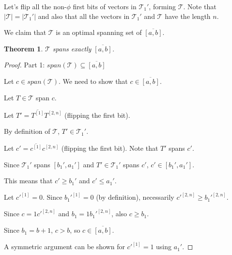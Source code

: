 \documentclass{article}
\theoremstyle{plain}
\newtheorem{theorem}{Theorem}[subsection]
\theoremstyle{definition}
\newcommand{\interval}[2]{[#1, #2]}
\newcommand{\compl}[1]{\overline{#1}}
\newcommand{\finterval}[2]{\compl{\interval{#1}{#2}}}
\newcommand{\bit}[2]{#1^{[#2]}}
\newcommand{\bits}[3]{#1^{\interval{#2}{#3}}}
\begin{document}
Let's flip all the non-$\phi$ first bits
of vectors in $\mathcal{T}_1'$,
forming $\mathcal{T}$.
Note that $|\mathcal{T}| = |\mathcal{T}_1'|$
and also that all the vectors in $\mathcal{T}_1'$
and $\mathcal{T}$ have the length $n$.

We claim that $\mathcal{T}$ is an optimal spanning set
of $\finterval{a}{b}$.

\begin{theorem} \label{diffsound}
$\mathcal{T}$ spans exactly $\finterval{a}{b}$.
\end{theorem}

\begin{proof}
Part 1: $span(\mathcal{T}) \subseteq \finterval{a}{b}$

Let $c \in span(\mathcal{T})$.
We need to show that $c \in \finterval{a}{b}$.

Let $T \in \mathcal{T}$ span $c$.

Let $T' = \compl{\bit{T}{1}} \bits{T}{2}{n}$
(flipping the first bit).

By definition of $\mathcal{T}$,
$T' \in \mathcal{T}_1'$.

Let $c' = \compl{\bit{c}{1}} \bits{c}{2}{n}$
(flipping the first bit).
Note that $T'$ spans $c'$.

Since $\mathcal{T}_1'$ spans $\interval{b_1'}{a_1'}$
and $T' \in \mathcal{T}_1'$ spans $c'$,
$c' \in \interval{b_1'}{a_1'}$.

This means that $c' \geq b_1'$ and $c' \leq a_1'$.

Let $\bit{c'}{1} = 0$.
Since $\bit{b_1'}{1} = 0$ (by definition),
necessarily $\bits{c'}{2}{n} \geq \bits{b_1'}{2}{n}$.

Since $c = 1 \bits{c'}{2}{n}$
and $b_1 = 1 \bits{b_1'}{2}{n}$,
also $c \geq b_1$.

Since $b_1 = b + 1$,
$c > b$,
so $c \in \finterval{a}{b}$.

A symmetric argument can be shown for $\bit{c'}{1} = 1$
using $a_1'$.
\end{proof}
\end{document}
